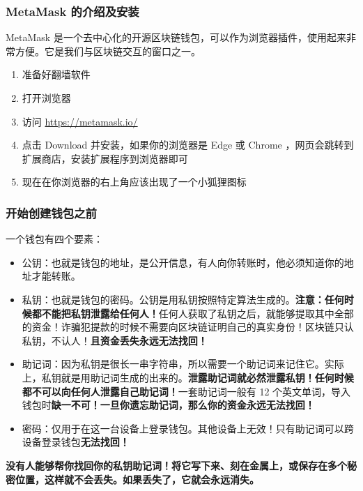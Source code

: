 \documentclass{beamer}
\begin{document}
\begin{frame}
    \frametitle{MetaMask 的介绍及安装}

    MetaMask 是一个去中心化的开源区块链钱包，可以作为浏览器插件，使用起来非常方便。它是我们与区块链交互的窗口之一。

    \begin{enumerate}
        \item 准备好翻墙软件
        \item 打开浏览器
        \item 访问 \url{https://metamask.io/}
        \item 点击 Download 并安装，如果你的浏览器是 Edge 或 Chrome ，网页会跳转到扩展商店，安装扩展程序到浏览器即可
        \item 现在在你浏览器的右上角应该出现了一个小狐狸图标
    \end{enumerate}

\end{frame}

\begin{frame}
    \frametitle{开始创建钱包之前}

    一个钱包有四个要素：

    \begin{itemize}
        \item 公钥：也就是钱包的地址，是公开信息，有人向你转账时，他必须知道你的地址才能转账。
        \item 私钥：也就是钱包的密码。公钥是用私钥按照特定算法生成的。\textbf{注意：任何时候都不能把私钥泄露给任何人！}任何人获取了私钥之后，就能够提取其中全部的资金！诈骗犯提款的时候不需要向区块链证明自己的真实身份！区块链只认私钥，不认人！\textbf{且资金丢失永远无法找回！}
        \item 助记词：因为私钥是很长一串字符串，所以需要一个助记词来记住它。实际上，私钥就是用助记词生成的出来的。\textbf{泄露助记词就必然泄露私钥！任何时候都不可以向任何人泄露自己助记词！}一套助记词一般有 12 个英文单词，导入钱包时\textbf{缺一不可！}\textbf{一旦你遗忘助记词，那么你的资金永远无法找回！}
        \item 密码：仅用于在这一台设备上登录钱包。其他设备上无效！只有助记词可以跨设备登录钱包\textbf{无法找回！}
    \end{itemize}

    \textbf{没有人能够帮你找回你的私钥助记词！将它写下来、刻在金属上，或保存在多个秘密位置，这样就不会丢失。如果丢失了，它就会永远消失。}

\end{frame}
\end{document}
